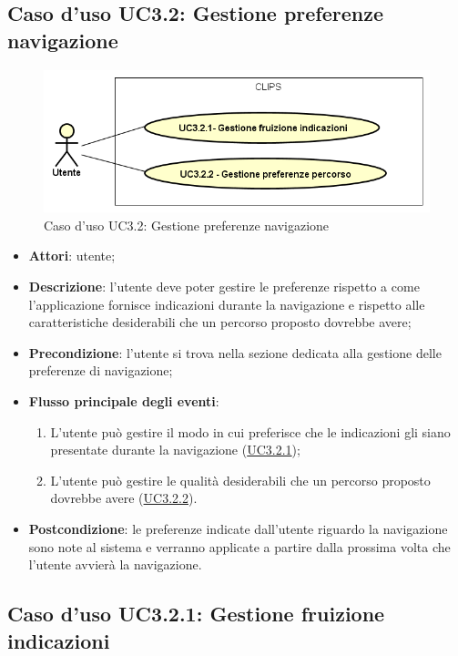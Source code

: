 \documentclass[../AnalisiDeiRequisiti.tex]{subfiles}
\begin{document}
\subsection{Caso d'uso UC3.2: Gestione preferenze navigazione}

\begin{figure}[H]
	\centering
	\includegraphics[scale=0.95, width=\textwidth]{img/UC3-2.png}
	\caption{Caso d'uso UC3.2: Gestione preferenze navigazione}\label{fig:UC3.2} 
\end{figure}
\begin{itemize}
	\item \textbf{Attori}: utente;
	\item \textbf{Descrizione}: l'utente deve poter gestire le preferenze rispetto a come l'applicazione fornisce indicazioni durante la navigazione e rispetto alle caratteristiche desiderabili che un percorso proposto dovrebbe avere; 
	\item \textbf{Precondizione}: l'utente si trova nella sezione dedicata alla gestione delle preferenze di navigazione;
	
	\item \textbf{Flusso principale degli eventi}:
	\begin{enumerate}
		\item L'utente può gestire il modo in cui preferisce che le indicazioni gli siano presentate durante la navigazione (\hyperlink{UC3.2.1}{UC3.2.1});
		\item L'utente può gestire le qualità desiderabili che un percorso proposto dovrebbe avere (\hyperlink{UC3.2.2}{UC3.2.2}).
		
	\end{enumerate}
	\item \textbf{Postcondizione}: le preferenze indicate dall'utente riguardo la navigazione sono note al sistema e verranno applicate a partire dalla prossima volta che l'utente avvierà la navigazione.
\end{itemize}
\hypertarget{UC3.2.1}{}
\subsection{Caso d'uso UC3.2.1: Gestione fruizione indicazioni}
\end{document}
